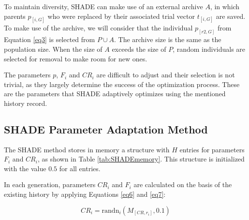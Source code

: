 \documentclass[review]{elsarticle}
\begin{document}
To maintain diversity, SHADE can make use of an external archive $A$, in which parents $p_{[i,G]}$ who were replaced by their associated trial vector $t_{[i,G]}$ are saved. To make use of the archive, we will consider that the individual $p_{[r2,G]}$ from Equation \eqref{eq3} is selected from $P \cup A$. The archive size is the same as the population size. When the size of $A$ exceeds the size of $P$, random individuals are selected for removal to make room for new ones.

The parameters $p$, $F_i$ and $CR_i$ are difficult to adjust and their selection is not trivial, as they largely determine the success of the optimization process. These are the parameters that SHADE adaptively optimizes using the mentioned history record.

\subsection{SHADE Parameter Adaptation Method}

The SHADE method stores in memory a structure with $H$ entries for parameters $F_i$ and $CR_i$, as shown in Table \ref{tab:SHADEmemory}. This structure is initialized with the value $0.5$ for all entries.

\begin{table}[!h]
	\centering
	\setlength{\tabcolsep}{13pt}
	\caption{Historical memory $M_{CR}$, $M_{F}$ used by SHADE \cite{tanabe2013success}}
	\label{tab:SHADEmemory}
\end{table}

In each generation, parameters $CR_i$ and $F_i$ are calculated on the basis of the existing history by applying Equations \eqref{eq6} and \eqref{eq7}:

\begin{equation}
CR_i = \text{randn}_i(M_{[CR,r_i]}, 0.1)
\label{eq6}
\end{equation}
\end{document}
